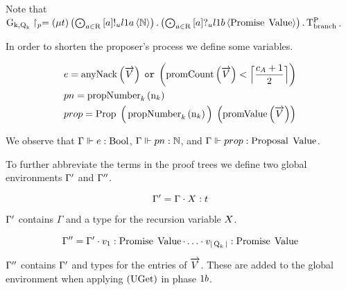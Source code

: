 Note that $\operatorname{G_{k, \operatorname{Q}_{k}}} \upharpoonright_{p} = \left(\mu t\right)
\textstyle\left(\bigodot_{a\in\operatorname{R}} \left[a\right]!_u l1a \left\langle \mathbb{N} \right\rangle\right) .
\textstyle\left(\bigodot_{a\in\operatorname{R}} \left[a\right]?_u l1b \left\langle \operatorname{Promise}\; \operatorname{Value} \right\rangle\right) . \operatorname{T^{P}_{branch}}$.

In order to shorten the proposer's process we define some variables.

\begin{align*}
&e = \operatorname{anyNack}\left(\overrightarrow{V}\right) \; \mathtt{or} \; \left(\operatorname{promCount}\left(\overrightarrow{V}\right) < \Big\lceil \frac{c_A + 1}{2} \Big\rceil\right)\\
&pn = \operatorname{propNumber}_k\left( \operatorname{n}_{k}\right)\\
&prop = \operatorname{Prop}\; \Big ( \operatorname{propNumber}_k\left( \operatorname{n}_{k}\right) \Big )\; \left(\operatorname{promValue}\left(\overrightarrow{V}\right)\right)
\end{align*}

We observe that $\Gamma\Vdash e:\operatorname{Bool}$, $\Gamma\Vdash pn:\mathbb{N}$, and $\Gamma\Vdash prop:\operatorname{Proposal}\; \operatorname{Value}$.

To further abbreviate the terms in the proof trees we define two global environments $\Gamma'$ and $\Gamma''$.

\[\Gamma'=\Gamma\cdot X:t\]

$\Gamma'$ contains $\Gamma$ and a type for the recursion variable $X$.

\[\Gamma'' = \Gamma' \cdot v_{1}:\operatorname{Promise}\; \operatorname{Value}\cdot\ldots\cdot v_{|\operatorname{Q}_{k}|}:\operatorname{Promise}\; \operatorname{Value}\]

$\Gamma''$ contains $\Gamma'$ and types for the entries of $\overrightarrow{V}$.
These are added to the global environment when applying $\left(\operatorname{UGet}\right)$ in phase $1b$.

